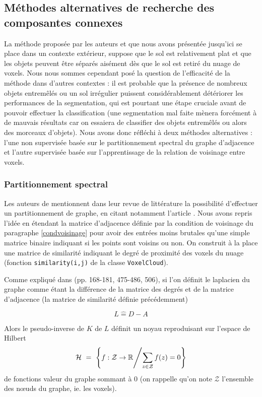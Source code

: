 \documentclass[a4paper, onecolumn, 11pt]{article}
\newcommand{\R}{\mathbb{R}}
\begin{document}
\subsection{Méthodes alternatives de recherche des composantes connexes}
La méthode proposée par les auteurs et que nous avons présentée jusqu'ici se place dans un contexte extérieur, suppose que le sol est relativement plat et que les objets peuvent être séparés aisément dès que le sol est retiré du nuage de voxels. Nous nous sommes cependant posé la question de l'efficacité de la méthode dans d'autres contextes : il est probable que la présence de nombreux objets entremêlés ou un sol irrégulier puissent considérablement détériorer les performances de la segmentation, qui est pourtant une étape cruciale avant de pouvoir effectuer la classification (une segmentation mal faite mènera forcément à de mauvais résultats car on essaiera de classifier des objets entremêlés ou alors des morceaux d'objets). Nous avons donc réfléchi à deux méthodes alternatives : l'une non supervisée basée sur le partitionnement spectral du graphe d'adjacence et l'autre supervisée basée sur l'apprentissage de la relation de voisinage entre voxels.

\subsubsection{Partitionnement spectral}
Les auteurs de \cite{aka_article} mentionnent dans leur revue de littérature la possibilité d'effectuer un partitionnement de graphe, en citant notamment l'article \cite{mincut}. Nous avons repris l'idée en étendant la matrice d'adjacence définie par la condition de voisinage du paragraphe \ref{condvoisinage} pour avoir des entrées moins brutales qu'une simple matrice binaire indiquant si les points sont voisins ou non. On construit à la place une matrice de similarité indiquant le degré de proximité des voxels du nuage (fonction \texttt{similarity(i,j)} de la classe \texttt{VoxelCloud}).

Comme expliqué dans \cite{kernels} (pp. 168-181, 475-486, 506), si l'on définit le laplacien du graphe comme étant la différence de la matrice des degrés et de la matrice d'adjacence (la matrice de similarité définie précédemment)

$$L\hat{=}D-A$$

Alors le pseudo-inverse de $K$ de $L$ définit un noyau reproduisant sur l'espace de Hilbert 
$$\mathcal{H}~=~\left\{f:\mathcal{Z}\rightarrow \R \middle/ \sum_{z\in\mathcal{Z}}f(z)=0\right\}$$ de fonctions valeur du graphe sommant à 0 (on rappelle qu'on note $\mathcal{Z}$ l'ensemble des nœuds du graphe, ie. les voxels).
\end{document}
